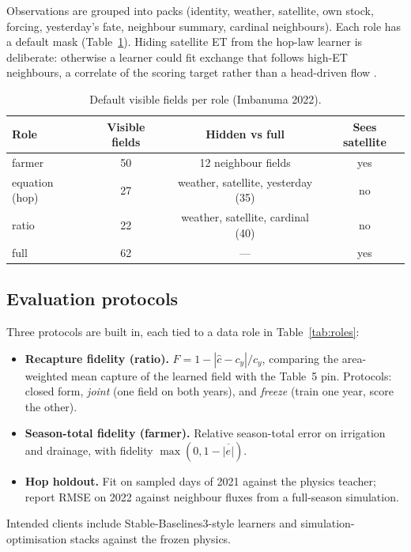 \documentclass[preprint,12pt,authoryear,review]{elsarticle}
\begin{document}
Observations are grouped into packs (identity, weather, satellite, own stock, forcing, yesterday's fate, neighbour summary, cardinal neighbours). Each role has a default mask (Table~\ref{tab:obs}). Hiding satellite ET from the hop-law learner is deliberate: otherwise a learner could fit exchange that follows high-ET neighbours, a correlate of the scoring target rather than a head-driven flow \citep{kaelbling1998}.

\begin{table}[htbp]
\centering
\footnotesize
\caption{Default visible fields per role (Imbanuma 2022).}
\label{tab:obs}
\begin{tabular}{lccc}
\toprule
Role & Visible fields & Hidden vs full & Sees satellite \\
\midrule
farmer & 50 & 12 neighbour fields & yes \\
equation (hop) & 27 & weather, satellite, yesterday (35) & no \\
ratio & 22 & weather, satellite, cardinal (40) & no \\
full & 62 & --- & yes \\
\bottomrule
\end{tabular}
\end{table}

\subsection{Evaluation protocols}

Three protocols are built in, each tied to a data role in Table~\ref{tab:roles}:
\begin{itemize}
\item \textbf{Recapture fidelity (ratio).} $F = 1 - |\hat{c}-c_y|/c_y$, comparing the area-weighted mean capture of the learned field with the Table~5 pin. Protocols: closed form, \emph{joint} (one field on both years), and \emph{freeze} (train one year, score the other).
\item \textbf{Season-total fidelity (farmer).} Relative season-total error on irrigation and drainage, with fidelity $\max(0,1-\overline{|e|})$.
\item \textbf{Hop holdout.} Fit on sampled days of 2021 against the physics teacher; report RMSE on 2022 against neighbour fluxes from a full-season simulation.
\end{itemize}
Intended clients include Stable-Baselines3-style learners \citep{raffin2021} and simulation-optimisation stacks \citep{giuliani2021} against the frozen physics.
\end{document}
